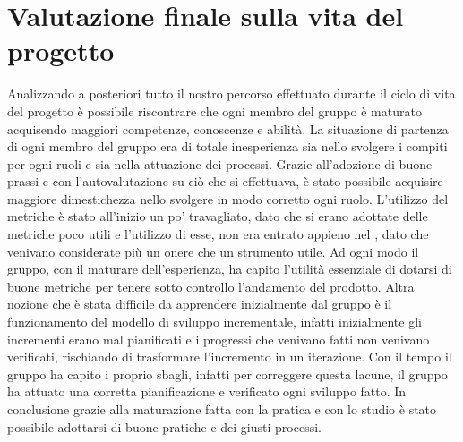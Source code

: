 \section{Valutazione finale sulla vita del progetto}
Analizzando a posteriori tutto il nostro percorso effettuato durante il ciclo di vita del progetto è possibile riscontrare che ogni membro del gruppo \Gruppo{} è maturato acquisendo maggiori competenze, conoscenze e abilità. La situazione di partenza di ogni membro del gruppo era di totale inesperienza sia nello svolgere i compiti per ogni ruoli e sia nella attuazione dei processi. Grazie all'adozione di buone prassi e con l'autovalutazione su ciò che si effettuava, è stato possibile acquisire maggiore dimestichezza nello svolgere in modo corretto ogni ruolo. L'utilizzo del metriche è stato all'inizio un po' travagliato, dato che si erano adottate delle metriche poco utili e l'utilizzo di esse, non era entrato appieno nel , dato che venivano considerate più un onere che un strumento utile. Ad ogni modo il gruppo, con il maturare dell'esperienza, ha capito l'utilità essenziale di dotarsi di buone metriche per tenere sotto controllo l'andamento del prodotto. Altra nozione che è stata difficile da apprendere inizialmente dal gruppo è il funzionamento del modello di sviluppo incrementale, infatti inizialmente gli incrementi erano mal pianificati e i progressi che venivano fatti non venivano verificati, rischiando di trasformare l'incremento in un iterazione. Con il tempo il gruppo ha capito i proprio sbagli, infatti per correggere questa lacune, il gruppo ha attuato una corretta pianificazione e verificato ogni sviluppo fatto. In conclusione grazie alla maturazione fatta con la pratica e con lo studio è stato possibile adottarsi di buone pratiche e dei giusti processi.